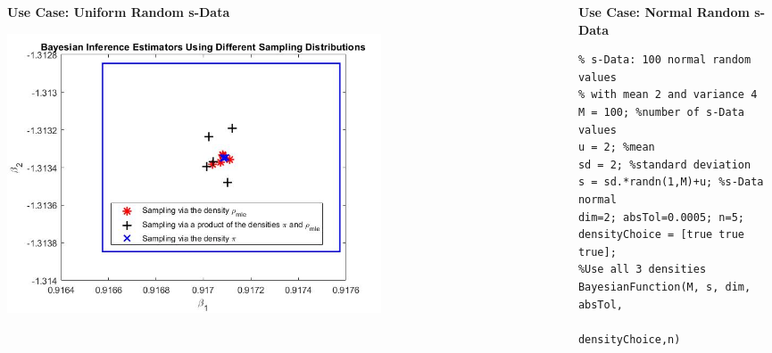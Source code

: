 \documentclass[final,mathserif]{beamer}
\newcommand{\blue}[1]{{\color{myblue}#1}}
\renewcommand{\blue}{\textcolor{blue!80!black}}
\begin{document}
\begin{frame}[fragile]
\begin{columns}[t]
\begin{column}{.31\linewidth}
\begin{block}{\Large \textbf{\blue {Use Case: Uniform Random s-Data}}}
\begin{center}
\includegraphics[width=0.7\textwidth]{UniformRandom}
\end{center} 
\end{block}
\end{column}

\begin{column}{.015\linewidth} \end{column} %

\begin{column}{.31\linewidth}
\begin{block}{\Large \textbf{\blue {Use Case: Normal Random s-Data}}}

\vspace{0.1in}    

\lstset{basicstyle=\small} 
\begin{lstlisting} 
% s-Data: 100 normal random values
% with mean 2 and variance 4      
M = 100; %number of s-Data values
u = 2; %mean
sd = 2; %standard deviation
s = sd.*randn(1,M)+u; %s-Data normal
dim=2; absTol=0.0005; n=5;
densityChoice = [true true true];
%Use all 3 densities
BayesianFunction(M, s, dim, absTol, 
                 densityChoice,n)
\end{lstlisting}     

\begin{center}
\end{center}


\end{block}
\end{column}
\end{columns}
\end{frame}
\end{document}
